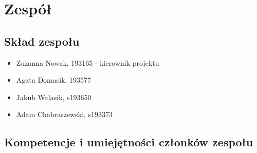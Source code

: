 \documentclass[12pt,a4paper]{book}
\begin{document}
\chapter{Zespół}
\section{Skład zespołu}
\begin{itemize}
        \item Zuzanna Nowak, 193165 - kierownik projektu
        \item Agata Domasik, 193577
        \item Jakub Walasik, s193650
        \item Adam Chabraszewski, s193373
\end{itemize}

\section{Kompetencje i umiejętności członków zespołu}
\end{document}
